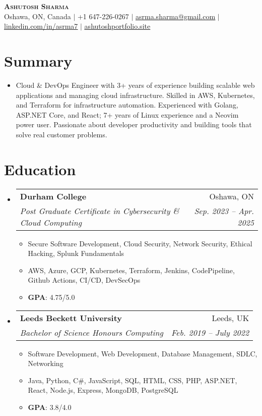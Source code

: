 \documentclass[letterpaper,11pt]{article}
\makeatletter
\newcommand{\resumeItem}[1]{
  \item\small{
    {#1 \vspace{-2pt}}
  }
}
\newcommand{\resumeSubheading}[4]{
  \vspace{-2pt}\item
    \begin{tabular*}{0.97\textwidth}[t]{l@{\extracolsep{\fill}}r}
      \textbf{#1} & #2 \\
      \textit{\small#3} & \textit{\small #4} \\
    \end{tabular*}\vspace{-7pt}
}
\newcommand{\resumeSubHeadingListStart}{\begin{itemize}[leftmargin=0.15in, label={}]}\newcommand{\resumeSubHeadingListEnd}{\end{itemize}}
\newcommand{\resumeItemListStart}{\begin{itemize}}\newcommand{\resumeItemListEnd}{\end{itemize}\vspace{-5pt}}
\makeatother
\begin{document}

\begin{center}
    \textbf{\Huge \scshape Ashutosh Sharma} \\ \vspace{1pt}
    {Oshawa, ON, Canada} $|$
    \small +1 647-226-0267 $|$ \href{mailto:asrma.sharma@gmail.com}{\underline{asrma.sharma@gmail.com}} $|$ 
    \href{https://linkedin.com/in/asrma7}{\underline{linkedin.com/in/asrma7}} $|$
    \href{https://ashutoshportfolio.site}{\underline{ashutoshportfolio.site}}
\end{center}

\section{Summary}
  \resumeSubHeadingListStart
    \item{
      {Cloud \& DevOps Engineer with 3+ years of experience building scalable web applications and managing cloud infrastructure.}
      {Skilled in AWS, Kubernetes, and Terraform for infrastructure automation.}
      {Experienced with Golang, ASP.NET Core, and React; 7+ years of Linux experience and a Neovim power user.}
      {Passionate about developer productivity and building tools that solve real customer problems.}
    }
  \resumeSubHeadingListEnd

\section{Education}
  \resumeSubHeadingListStart
    \resumeSubheading
      {Durham College}{Oshawa, ON}
      {Post Graduate Certificate in Cybersecurity \& Cloud Computing}{Sep. 2023 -- Apr. 2025}
      \resumeItemListStart
        \resumeItem{Secure Software Development, Cloud Security, Network Security, Ethical Hacking, Splunk Fundamentals}
        \resumeItem{AWS, Azure, GCP, Kubernetes, Terraform, Jenkins, CodePipeline, Github Actions, CI/CD, DevSecOps}
        \resumeItem{\textbf{GPA}: 4.75/5.0}
      \resumeItemListEnd
    \resumeSubheading
      {Leeds Beckett University}{Leeds, UK}
      {Bachelor of Science Honours Computing}{Feb. 2019 -- July 2022}
        \resumeItemListStart
            \resumeItem{Software Development, Web Development, Database Management, SDLC, Networking}
            \resumeItem{Java, Python, C\#, JavaScript, SQL, HTML, CSS, PHP, ASP.NET, React, Node.js, Express, MongoDB, PostgreSQL}
            \resumeItem{\textbf{GPA}: 3.8/4.0}
        \resumeItemListEnd
  \resumeSubHeadingListEnd
\end{document}
